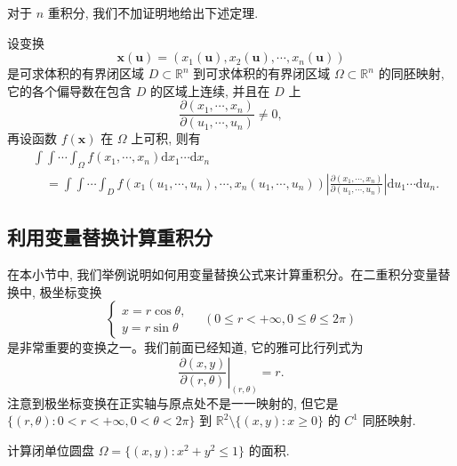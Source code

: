 对于 $n$ 重积分, 我们不加证明地给出下述定理.

\begin{theorem}\label{theorem:ma-15-4-3}
设变换
\[
  \boldsymbol x(\boldsymbol u)=(x_1(\boldsymbol u),x_2(\boldsymbol u),\cdots,x_n(\boldsymbol u))
\]
是可求体积的有界闭区域 $D\subset\mathbb R^n$ 到可求体积的有界闭区域 $\Omega\subset\mathbb R^n$ 的同胚映射, 它的各个偏导数在包含 $D$ 的区域上连续, 并且在 $D$ 上
\[
  \frac{\partial(x_1,\cdots,x_n)}{\partial(u_1,\cdots,u_n)}\ne0,
\]
再设函数 $f(\boldsymbol x)$ 在 $\Omega$ 上可积, 则有
\[
\begin{aligned}
  &\int\!\!\int\cdots\int_\Omega f(x_1,\cdots,x_n)\mathrm dx_1\cdots\mathrm dx_n\\
  &\quad=\int\!\!\int\cdots\int_D
  f(x_1(u_1,\cdots,u_n),\cdots,x_n(u_1,\cdots,u_n))
  \left|\frac{\partial(x_1,\cdots,x_n)}{\partial(u_1,\cdots,u_n)}\right|
  \mathrm du_1\cdots\mathrm du_n.
\end{aligned}
\]
\end{theorem}


\subsection{利用变量替换计算重积分}
\label{subsec:ma-15-4-2}

在本小节中, 我们举例说明如何用变量替换公式来计算重积分。在二重积分变量替换中, 极坐标变换
\[
  \begin{cases}
    x=r\cos\theta,\\
    y=r\sin\theta
  \end{cases}
  \quad(0\leqslant r<+\infty,0\leqslant\theta\leqslant2\pi)
\]
是非常重要的变换之一。我们前面已经知道, 它的雅可比行列式为
\[
  \left.\frac{\partial(x,y)}{\partial(r,\theta)}\right|_{(r,\theta)}=r.
\]
注意到极坐标变换在正实轴与原点处不是一一映射的, 但它是 $\{(r,\theta):0<r<+\infty,0<\theta<2\pi\}$ 到 $\mathbb R^2\setminus\{(x,y):x\geqslant0\}$ 的 $C^1$ 同胚映射.

\begin{example}\label{example:ma-15-4-1}
计算闭单位圆盘 $\Omega=\{(x,y):x^2+y^2\leqslant1\}$ 的面积.
\end{example}


